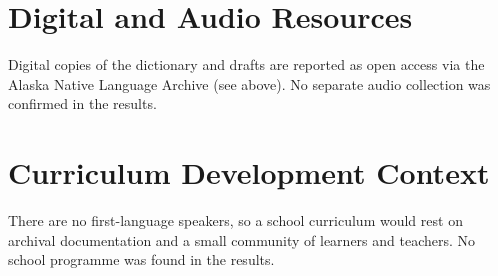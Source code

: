\documentclass[12pt]{article}
\begin{document}
\section{Digital and Audio Resources}
Digital copies of the dictionary and drafts are reported as open access via the Alaska Native Language Archive (see above). No separate audio collection was confirmed in the results.

\section{Curriculum Development Context}
There are no first-language speakers, so a school curriculum would rest on archival documentation and a small community of learners and teachers. No school programme was found in the results.
\end{document}
